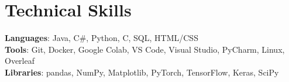 \documentclass[a4paper,11pt]{article}
\begin{document}
%
\section{Technical Skills}
 \begin{itemize}[leftmargin=0.15in, label={}]
    \small{\item{
     \textbf{Languages}{: Java, C\#, Python, C, SQL, HTML/CSS} \\
     \textbf{Tools}{: Git, Docker, Google Colab, VS Code, Visual Studio, PyCharm, Linux, Overleaf} \\
     \textbf{Libraries}{: pandas, NumPy, Matplotlib, PyTorch, TensorFlow, Keras, SciPy}
    }}
 \end{itemize}


\end{document}
